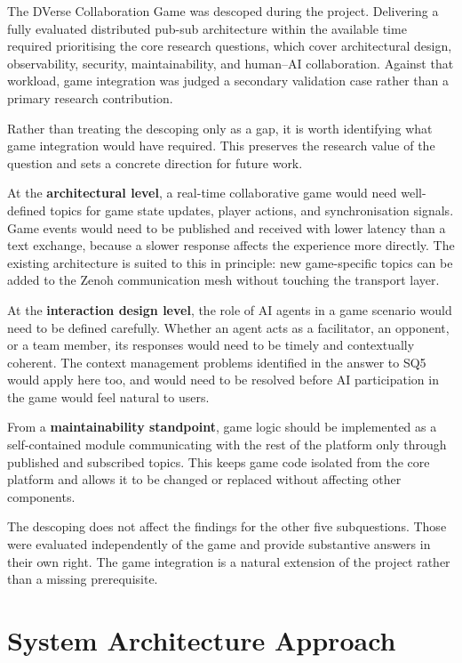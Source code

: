 \documentclass[11pt]{article}
\begin{document}
The DVerse Collaboration Game was descoped during the project. Delivering a fully evaluated distributed pub-sub architecture within the available time required prioritising the core research questions, which cover architectural design, observability, security, maintainability, and human--AI collaboration. Against that workload, game integration was judged a secondary validation case rather than a primary research contribution.

Rather than treating the descoping only as a gap, it is worth identifying what game integration would have required. This preserves the research value of the question and sets a concrete direction for future work.

At the \textbf{architectural level}, a real-time collaborative game would need well-defined topics for game state updates, player actions, and synchronisation signals. Game events would need to be published and received with lower latency than a text exchange, because a slower response affects the experience more directly. The existing architecture is suited to this in principle: new game-specific topics can be added to the Zenoh communication mesh without touching the transport layer.

At the \textbf{interaction design level}, the role of AI agents in a game scenario would need to be defined carefully. Whether an agent acts as a facilitator, an opponent, or a team member, its responses would need to be timely and contextually coherent. The context management problems identified in the answer to SQ5 would apply here too, and would need to be resolved before AI participation in the game would feel natural to users.

From a \textbf{maintainability standpoint}, game logic should be implemented as a self-contained module communicating with the rest of the platform only through published and subscribed topics. This keeps game code isolated from the core platform and allows it to be changed or replaced without affecting other components.

The descoping does not affect the findings for the other five subquestions. Those were evaluated independently of the game and provide substantive answers in their own right. The game integration is a natural extension of the project rather than a missing prerequisite.

\section{System Architecture Approach}
\end{document}

